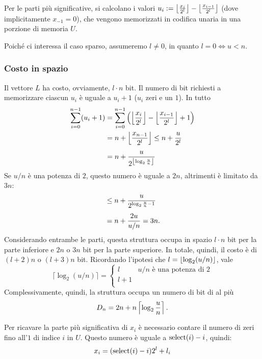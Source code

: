 Per le parti più significative, si calcolano i valori $u_i:=\left\lfloor \frac{x_i}{2^l} \right\rfloor-\left\lfloor \frac{x_{i-1}}{2^l} \right\rfloor$ (dove implicitamente $x_{-1}=0$), che vengono memorizzati in codifica unaria in una porzione di memoria $U$.

Poiché ci interessa il caso sparso, assumeremo $l\neq 0$, in quanto $l=0 \iff u<n$.


\subsubsection{Costo in spazio}
Il vettore $L$ ha costo, ovviamente, $l\cdot n$ bit.
Il numero di bit richiesti a memorizzare ciascun $u_i$ è uguale a $u_i+1$ ($u_i$ zeri e un $1$). In tutto
\begin{align*}
	\sum_{i=0}^{n-1}(u_i+1) & = \sum_{i=0}^{n-1}\left(\left\lfloor \frac{x_i}{2^l} \right\rfloor-\left\lfloor \frac{x_{i-1}}{2^l} \right\rfloor+1\right) \\
	                        & = n + \left\lfloor \frac{x_{n-1}}{2^l} \right\rfloor \leq n + \frac{u}{2^l}                             \\[1ex]
	                        & = n + \frac{u}{2^{\left\lfloor \log_2\frac{u}{n} \right\rfloor}}
\end{align*}
Se $u/n$ è una potenza di $2$, questo numero è uguale a $2n$, altrimenti è limitato da $3n$:
\begin{align*}
	 & \leq n+\frac{u}{2^{\log_2\frac{u}{n}-1}} \\[1ex]
	 & = n+\frac{2u}{u/n} = 3n \text.
\end{align*}
Considerando entrambe le parti, questa struttura occupa in spazio $l\cdot n$ bit per la parte inferiore e $2n$ o $3n$ bit per la parte superiore.
In totale, quindi, il costo è di $(l+2)n$ o $(l+3)n$ bit.
Ricordando l'ipotesi che $l=\left\lfloor \log_2(u/n) \right\rfloor$, vale
\begin{equation*}
	\lceil \log_2(u/n) \rceil =
	\begin{cases}
		l & u/n \text{ è una potenza di } 2 \\
		l +1                                \\
	\end{cases}
\end{equation*}
Complessivamente, quindi, la struttura occupa un numero di bit di al più
\begin{equation*}
	D_n = 2n+n\left\lceil \log_2\frac un \right\rceil \text.
\end{equation*}


Per ricavare la parte più significativa di $x_i$ è necessario contare il numero di zeri fino all'$1$ di indice $i$ in $U$. Questo numero è uguale a $\mathrm{select}(i)-i$, quindi:
\begin{equation*}
	x_i=(\mathrm{select}(i)-i)2^l+l_i
\end{equation*}

